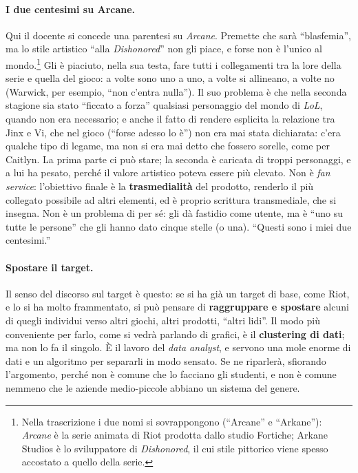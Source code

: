 \paragraph{I due centesimi su Arcane.} Qui il docente si concede una
parentesi su \emph{Arcane}. Premette che sarà ``blasfemia'', ma lo stile
artistico ``alla \emph{Dishonored}'' non gli piace, e forse non è l'unico al
mondo.\footnote{Nella trascrizione i due nomi si sovrappongono (``Arcane'' e
``Arkane''): \emph{Arcane} è la serie animata di Riot prodotta dallo studio
Fortiche; Arkane Studios è lo sviluppatore di \emph{Dishonored}, il cui stile
pittorico viene spesso accostato a quello della serie.} Gli è piaciuto, nella
sua testa, fare tutti i collegamenti tra la lore della serie e quella del
gioco: a volte sono uno a uno, a volte si allineano, a volte no (Warwick,
per esempio, ``non c'entra nulla''). Il suo problema è che nella seconda
stagione sia stato ``ficcato a forza'' qualsiasi personaggio del mondo di
\emph{LoL}, quando non era necessario; e anche il fatto di rendere esplicita
la relazione tra Jinx e Vi, che nel gioco (``forse adesso lo è'') non era mai
stata dichiarata: c'era qualche tipo di legame, ma non si era mai detto che
fossero sorelle, come per Caitlyn. La prima parte ci può stare; la seconda è
caricata di troppi personaggi, e a lui ha pesato, perché il valore artistico
poteva essere più elevato. Non è \emph{fan service}: l'obiettivo finale è la
\textbf{trasmedialità} del prodotto, renderlo il più collegato possibile ad
altri elementi, ed è proprio scrittura transmediale, che si insegna. Non è un
problema di per sé: gli dà fastidio come utente, ma è ``uno su tutte le
persone'' che gli hanno dato cinque stelle (o una). ``Questi sono i miei due
centesimi.''

\paragraph{Spostare il target.} Il senso del discorso sul target è questo: se
si ha già un target di base, come Riot, e lo si ha molto frammentato, si può
pensare di \textbf{raggruppare e spostare} alcuni di quegli individui verso
altri giochi, altri prodotti, ``altri lidi''. Il modo più conveniente per
farlo, come si vedrà parlando di grafici, è il \textbf{clustering di dati};
ma non lo fa il singolo. È il lavoro del \emph{data analyst}, e servono una
mole enorme di dati e un algoritmo per separarli in modo sensato. Se ne
riparlerà, sfiorando l'argomento, perché non è comune che lo facciano gli
studenti, e non è comune nemmeno che le aziende medio-piccole abbiano un
sistema del genere.

